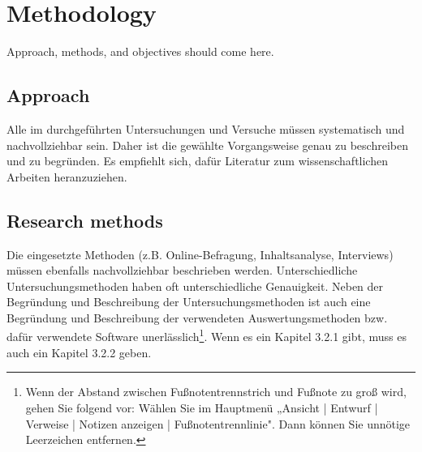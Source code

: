 \chapter{Methodology}

Approach, methods, and objectives should come here.

\section{Approach}
Alle im durchgeführten Untersuchungen und Versuche müssen systematisch und
nachvollziehbar sein. Daher ist die gewählte Vorgangsweise genau zu beschreiben
und zu begründen. Es empfiehlt sich, dafür Literatur zum wissenschaftlichen Arbeiten
heranzuziehen.

\section{Research methods}
Die eingesetzte Methoden (z.B. Online-Befragung, Inhaltsanalyse, Interviews) müssen
ebenfalls nachvollziehbar beschrieben werden.
Unterschiedliche Untersuchungsmethoden haben oft unterschiedliche Genauigkeit.
Neben der Begründung und Beschreibung der Untersuchungsmethoden ist auch eine
Begründung und Beschreibung der verwendeten Auswertungsmethoden bzw. dafür
verwendete Software unerlässlich\footnote{Wenn der Abstand zwischen Fußnotentrennstrich und Fußnote zu groß wird, gehen Sie folgend vor:
	Wählen Sie im Hauptmenü „Ansicht | Entwurf | Verweise | Notizen anzeigen |
	Fußnotentrennlinie". Dann können Sie unnötige Leerzeichen entfernen.
}.
Wenn es ein Kapitel 3.2.1 gibt, muss es auch ein Kapitel 3.2.2 geben.

